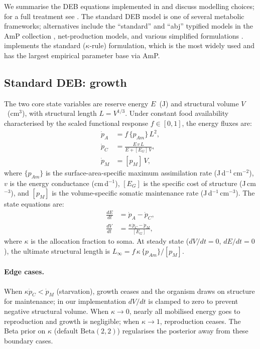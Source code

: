 \documentclass[article,shortnames]{jss}
\newcommand{\pAm}{\{p_{Am}\}}
\newcommand{\pM}{[p_M]}
\newcommand{\EG}{[E_G]}
\begin{document}
We summarise the DEB equations implemented in  and
discuss modelling choices; for a full treatment see
\citet{Kooijman2010}.  The standard DEB model is one of several
metabolic frameworks; alternatives include the ``standard'' and
``abj'' typified models in the AmP collection \citep{MarquesAmP2018},
net-production models, and various simplified formulations
\citep{JagerZimmer2012}.   implements the standard
($\kappa$-rule) formulation, which is the most widely used and has the
largest empirical parameter base via AmP.

\subsection{Standard DEB: growth} \label{sec:growth}

The two core state variables are reserve energy $E$~(J) and structural
volume $V$~(cm$^3$), with structural length $L = V^{1/3}$.  Under
constant food availability characterised by the scaled functional
response $f \in [0, 1]$, the energy fluxes are:
\begin{align}
  \dot{p}_A &= f \, \pAm \, L^2,  \label{eq:pA} \\
  \dot{p}_C &= \frac{E \, v \, L}{E + \EG \, V},  \label{eq:pC} \\
  \dot{p}_M &= \pM \, V,  \label{eq:pM}
\end{align}
where $\pAm$ is the surface-area-specific maximum assimilation rate
(J\,d$^{-1}$\,cm$^{-2}$), $v$ is the energy conductance
(cm\,d$^{-1}$), $\EG$ is the specific cost of structure
(J\,cm$^{-3}$), and $\pM$ is the volume-specific somatic maintenance
rate (J\,d$^{-1}$\,cm$^{-3}$).  The state equations are:
\begin{align}
  \frac{dE}{dt} &= \dot{p}_A - \dot{p}_C,  \label{eq:dE} \\
  \frac{dV}{dt} &= \frac{\kappa \, \dot{p}_C - \dot{p}_M}{\EG},
    \label{eq:dV}
\end{align}
where $\kappa$ is the allocation fraction to soma.  At steady state
($dV/dt = 0$, $dE/dt = 0$), the ultimate structural length is
$L_\infty = f \, \kappa \, \pAm / \pM$.

\paragraph{Edge cases.}
When $\kappa \dot{p}_C < \dot{p}_M$ (starvation), growth ceases and
the organism draws on structure for maintenance; in our implementation
$dV/dt$ is clamped to zero to prevent negative structural volume.
When $\kappa \to 0$, nearly all mobilised energy goes to reproduction
and growth is negligible; when $\kappa \to 1$, reproduction ceases.
The Beta prior on $\kappa$ (default $\mathrm{Beta}(2,2)$) regularises
the posterior away from these boundary cases.
\end{document}
